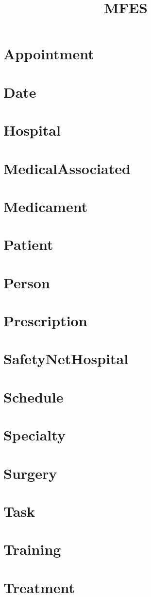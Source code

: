 \documentclass{article}
\begin{document}
\title{MFES}
\author{}
\maketitle
\tableofcontents

\section{Appointment}

\section{Date}

\section{Hospital}

\section{MedicalAssociated}

\section{Medicament}

\section{Patient}

\section{Person}

\section{Prescription}

\section{SafetyNetHospital}

\section{Schedule}

\section{Specialty}

\section{Surgery}

\section{Task}

\section{Training}

\section{Treatment}

\end{document}
